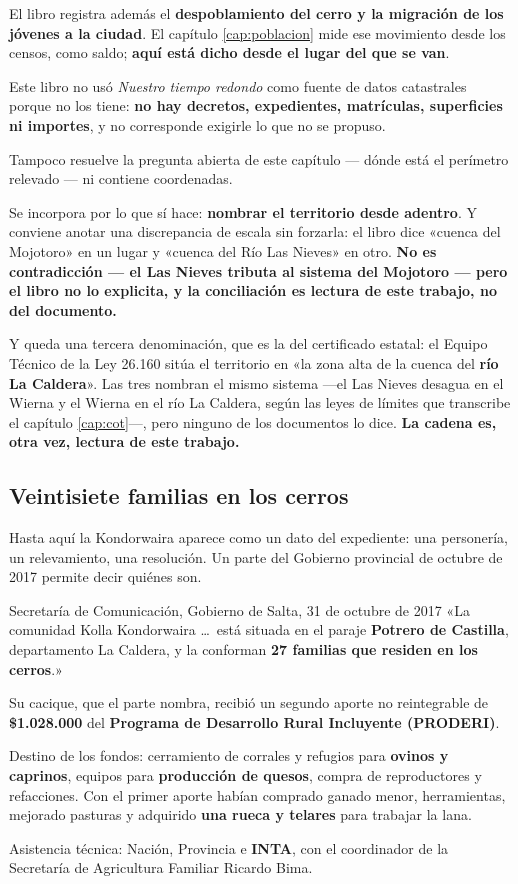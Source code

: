 El libro registra además el \textbf{despoblamiento del cerro y la migración de los jóvenes a la
ciudad}. El capítulo \ref{cap:poblacion} mide ese movimiento desde los censos, como saldo; \textbf{aquí está
dicho desde el lugar del que se van}.

\begin{cautela}
Este libro no usó \textit{Nuestro tiempo redondo} como fuente de datos catastrales porque no
los tiene: \textbf{no hay decretos, expedientes, matrículas, superficies ni importes}, y no
corresponde exigirle lo que no se propuso.

Tampoco resuelve la pregunta abierta de este capítulo --- dónde está el perímetro relevado ---
ni contiene coordenadas.

Se incorpora por lo que sí hace: \textbf{nombrar el territorio desde adentro}. Y conviene
anotar una discrepancia de escala sin forzarla: el libro dice «cuenca del Mojotoro» en un
lugar y «cuenca del Río Las Nieves» en otro. \textbf{No es contradicción --- el Las Nieves
tributa al sistema del Mojotoro --- pero el libro no lo explicita, y la conciliación es lectura
de este trabajo, no del documento.}

Y queda una tercera denominación, que es la del certificado estatal: el Equipo Técnico de la Ley 26.160 sitúa el territorio en «la zona alta de la cuenca del \textbf{río La Caldera}». Las tres nombran el mismo sistema ---el Las Nieves desagua en el Wierna y el Wierna en el río La Caldera, según las leyes de límites que transcribe el capítulo \ref{cap:cot}---, pero ninguno de los documentos lo dice. \textbf{La cadena es, otra vez, lectura de este trabajo.}
\end{cautela}

\subsection*{Veintisiete familias en los cerros}

Hasta aquí la Kondorwaira aparece como un dato del expediente: una personería, un
relevamiento, una resolución. Un parte del Gobierno provincial de octubre de 2017 permite
decir quiénes son.

\begin{ficha}{Secretaría de Comunicación, Gobierno de Salta, 31 de octubre de 2017}
«La comunidad Kolla Kondorwaira \ldots\ está situada en el paraje \textbf{Potrero de Castilla},
departamento La Caldera, y la conforman \textbf{27 familias que residen en los cerros}.»

Su cacique, que el parte nombra, recibió un segundo aporte no reintegrable de
\textbf{\$1.028.000} del \textbf{Programa de Desarrollo Rural Incluyente (PRODERI)}.

Destino de los fondos: cerramiento de corrales y refugios para \textbf{ovinos y caprinos},
equipos para \textbf{producción de quesos}, compra de reproductores y refacciones. Con el
primer aporte habían comprado ganado menor, herramientas, mejorado pasturas y adquirido
\textbf{una rueca y telares} para trabajar la lana.

Asistencia técnica: Nación, Provincia e \textbf{INTA}, con el coordinador de la Secretaría de
Agricultura Familiar Ricardo Bima.
\end{ficha}

